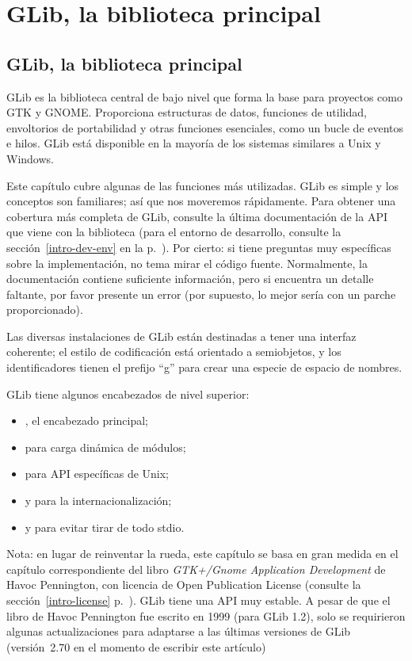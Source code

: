 \part{GLib, la biblioteca principal\label{glib}}

\chapter{GLib, la biblioteca principal}

GLib es la biblioteca central de bajo nivel que forma la base para proyectos como GTK y GNOME. Proporciona estructuras de datos, funciones de utilidad, envoltorios de portabilidad y otras funciones esenciales, como un bucle de eventos e hilos. GLib está disponible en la mayoría de los sistemas similares a Unix y Windows.

Este capítulo cubre algunas de las funciones más utilizadas. GLib es simple y los conceptos son familiares; así que nos moveremos rápidamente. Para obtener una cobertura más completa de GLib, consulte la última documentación de la API que viene con la biblioteca (para el entorno de desarrollo, consulte la sección~\ref{intro-dev-env} en la p.~\pageref{intro-dev-env}). Por cierto: si tiene preguntas muy específicas sobre la implementación, no tema mirar el código fuente. Normalmente, la documentación contiene suficiente información, pero si encuentra un detalle faltante, por favor presente un error (por supuesto, lo mejor sería con un parche proporcionado).

Las diversas instalaciones de GLib están destinadas a tener una interfaz coherente; el estilo de codificación está orientado a semiobjetos, y los identificadores tienen el prefijo ``g'' para crear una especie de espacio de nombres.

GLib tiene algunos encabezados de nivel superior:
\begin{itemize}
    \item {}, el encabezado principal;
    \item {} para carga dinámica de módulos;
    \item {} para API específicas de Unix;
    \item {} y  para la internacionalización;
    \item {} y  para evitar tirar de todo stdio.
\end{itemize}

\bigskip
Nota: en lugar de reinventar la rueda, este capítulo se basa en gran medida en el capítulo correspondiente del libro \emph{GTK+/Gnome Application Development} de Havoc Pennington, con licencia de Open Publication License (consulte la sección~\ref{intro-license} p.~\pageref{intro-license}). GLib tiene una API muy estable. A pesar de que el libro de Havoc Pennington fue escrito en 1999 (para GLib 1.2), solo se requirieron algunas actualizaciones para adaptarse a las últimas versiones de GLib (versión~2.70 en el momento de escribir este artículo)

